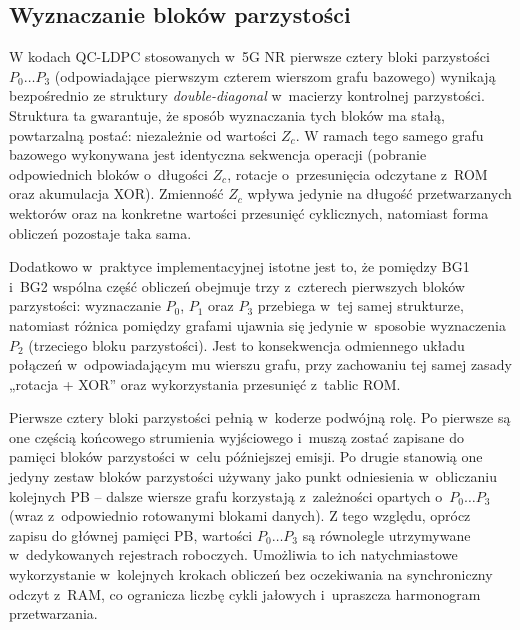 
\subsection{Wyznaczanie bloków parzystości}
\label{subsec:ldpc_enc_parity_cases}

W kodach QC-LDPC stosowanych w~5G NR pierwsze cztery bloki parzystości $P_0 \ldots P_3$ (odpowiadające pierwszym czterem wierszom grafu bazowego) wynikają bezpośrednio ze struktury \emph{double-diagonal} w~macierzy kontrolnej parzystości. Struktura ta gwarantuje, że sposób wyznaczania tych bloków ma stałą, powtarzalną postać: niezależnie od wartości $Z_c$. W ramach tego samego grafu bazowego wykonywana jest identyczna sekwencja operacji (pobranie odpowiednich bloków o~długości $Z_c$, rotacje o~przesunięcia odczytane z~ROM oraz akumulacja XOR). Zmienność $Z_c$ wpływa jedynie na długość przetwarzanych wektorów oraz na konkretne wartości przesunięć cyklicznych, natomiast forma obliczeń pozostaje taka sama.

Dodatkowo w~praktyce implementacyjnej istotne jest to, że pomiędzy BG1 i~BG2 wspólna część obliczeń obejmuje trzy z~czterech pierwszych bloków parzystości: wyznaczanie $P_0$, $P_1$ oraz $P_3$ przebiega w~tej samej strukturze, natomiast różnica pomiędzy grafami ujawnia się jedynie w~sposobie wyznaczenia $P_2$ (trzeciego bloku parzystości). Jest to konsekwencja odmiennego układu połączeń w~odpowiadającym mu wierszu grafu, przy zachowaniu tej samej zasady „rotacja + XOR” oraz wykorzystania przesunięć z~tablic ROM.

Pierwsze cztery bloki parzystości pełnią w~koderze podwójną rolę. Po pierwsze są one częścią końcowego strumienia wyjściowego i~muszą zostać zapisane do pamięci bloków parzystości w~celu późniejszej emisji. Po drugie stanowią one jedyny zestaw bloków parzystości używany jako punkt odniesienia w~obliczaniu kolejnych PB -- dalsze wiersze grafu korzystają z~zależności opartych o~$P_0 \ldots P_3$ (wraz z~odpowiednio rotowanymi blokami danych). Z tego względu, oprócz zapisu do głównej pamięci PB, wartości $P_0 \ldots P_3$ są równolegle utrzymywane w~dedykowanych rejestrach roboczych. Umożliwia to ich natychmiastowe wykorzystanie w~kolejnych krokach obliczeń bez oczekiwania na synchroniczny odczyt z~RAM, co ogranicza liczbę cykli jałowych i~upraszcza harmonogram przetwarzania.




